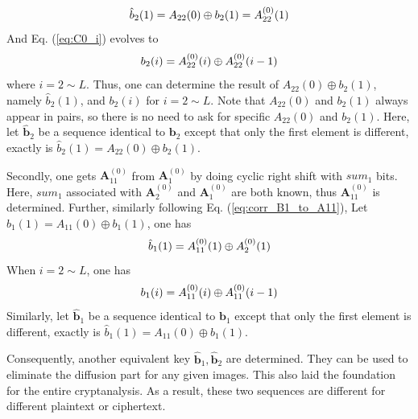 \documentclass[final,3p,times,twocolumn]{elsarticle}
\begin{document}
\begin{equation*}
\hat{b}_{2}(1)=A_{22}(0) \oplus b_{2}(1)=A_{22}^{(0)}(1) \\
\end{equation*}
And Eq. (\ref{eq:C0_i}) evolves to
\begin{equation*}
b_{2}(i) = A_{22}^{(0)}(i) \oplus A_{22}^{(0)}(i-1) \\
\end{equation*}
where $i=2 \sim L$. Thus, one can determine the result of $A_{22}(0) \oplus b_{2}(1)$, namely $\hat{b}_{2}(1)$, and $b_{2}(i)$ for $i=2 \sim L$. Note that $A_{22}(0)$ and $b_{2}(1)$ always appear in pairs, so there is no need to ask for specific $A_{22}(0)$ and $b_{2}(1)$. Here, let $\bm{\hat{b}}_2$ be a sequence identical to $\bm{b}_2$ except that only the first element is different, exactly is $\hat{b}_{2}(1)=A_{22}(0) \oplus b_{2}(1)$.

Secondly, one gets $\bm{A}_{11}^{(0)}$ from $\bm{A}_{1}^{(0)}$ by doing cyclic right shift with $sum_1$ bits. Here, $sum_1$ associated with $\bm{A}_{2}^{(0)}$ and $\bm{A}_{1}^{(0)}$ are both known, thus $\bm{A}_{11}^{(0)}$ is determined. Further, similarly following Eq. (\ref{eq:corr_B1_to_A11}), 
Let $\hat{b}_{1}(1)=A_{11}(0) \oplus b_{1}(1)$, one has
\begin{equation*}
\hat{b}_{1}(1)=A_{11}^{(0)}(1) \oplus A_{2}^{(0)}(1) \\
\end{equation*}
When $i=2 \sim L$, one has
\begin{equation*}
b_{1}(i) = A_{11}^{(0)}(i) \oplus  A_{11}^{(0)}(i-1) \\
\end{equation*}
Similarly, let $\bm{\hat{b}}_1$ be a sequence identical to $\bm{b}_1$ except that only the first element is different, exactly is $\hat{b}_{1}(1)=A_{11}(0) \oplus b_{1}(1)$.

Consequently, another equivalent key $\bm{\hat{b}}_1,\bm{\hat{b}}_2$ are determined. They can be used to eliminate the diffusion part for any given images. This also laid the foundation for the entire cryptanalysis. As a result, these two sequences are different for different plaintext or ciphertext.
\end{document}
